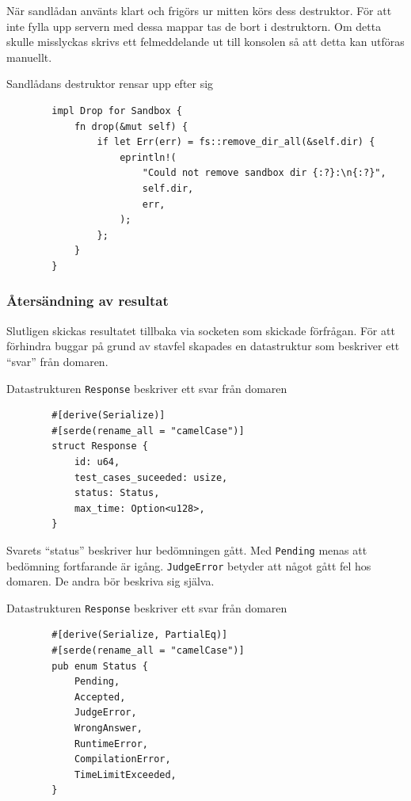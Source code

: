 \documentclass{article}
\begin{document}
När sandlådan använts klart och frigörs ur mitten körs dess destruktor. För att
inte fylla upp servern med dessa mappar tas de bort i destruktorn. Om detta
skulle misslyckas skrivs ett felmeddelande ut till konsolen så att detta kan
utföras manuellt.

\begin{listing}[H]
	\caption{Sandlådans destruktor rensar upp efter sig}
	\begin{verbatim}
		impl Drop for Sandbox {
			fn drop(&mut self) {
				if let Err(err) = fs::remove_dir_all(&self.dir) {
					eprintln!(
						"Could not remove sandbox dir {:?}:\n{:?}",
						self.dir,
						err,
					);
				};
			}
		}
	\end{verbatim}
\end{listing}

\subsubsection{Återsändning av resultat}

Slutligen skickas resultatet tillbaka via socketen som skickade förfrågan. För
att förhindra buggar på grund av stavfel skapades en datastruktur som beskriver
ett ``svar'' från domaren.

\begin{listing}[H]
	\caption{Datastrukturen \texttt{Response} beskriver ett svar från domaren}
	\begin{verbatim}
		#[derive(Serialize)]
		#[serde(rename_all = "camelCase")]
		struct Response {
			id: u64,
			test_cases_suceeded: usize,
			status: Status,
			max_time: Option<u128>,
		}
	\end{verbatim}
\end{listing}

Svarets ``status'' beskriver hur bedömningen gått. Med \texttt{Pending} menas
att bedömning fortfarande är igång. \texttt{JudgeError} betyder att något gått
fel hos domaren. De andra bör beskriva sig själva.

\begin{listing}[H]
	\caption{Datastrukturen \texttt{Response} beskriver ett svar från domaren}
	\label{status-enum}
	\begin{verbatim}
		#[derive(Serialize, PartialEq)]
		#[serde(rename_all = "camelCase")]
		pub enum Status {
			Pending,
			Accepted,
			JudgeError,
			WrongAnswer,
			RuntimeError,
			CompilationError,
			TimeLimitExceeded,
		}
	\end{verbatim}
\end{listing}
\end{document}
